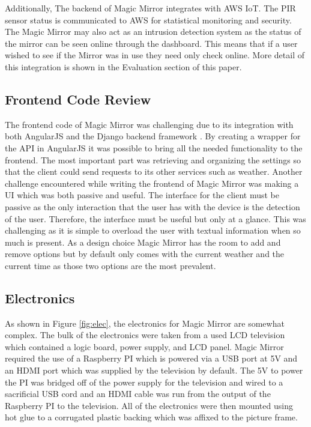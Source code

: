 \documentclass[conference]{IEEEtran}
\begin{document}
Additionally, The backend of Magic Mirror integrates with AWS IoT.
The PIR sensor status is communicated to AWS for statistical monitoring and security.
The Magic Mirror may also act as an intrusion detection system as the status of the mirror can be seen online through the dashboard.
This means that if a user wished to see if the Mirror was in use they need only check online.
More detail of this integration is shown in the Evaluation section of this paper.

\subsection{Frontend Code Review}
The frontend code of Magic Mirror was challenging due to its integration with both AngularJS and the Django backend framework \cite{angularjs}.
By creating a wrapper for the API in AngularJS it was possible to bring all the needed functionality to the frontend.
The most important part was retrieving and organizing the settings so that the client could send requests to its other services such as weather.
Another challenge encountered while writing the frontend of Magic Mirror was making a UI which was both passive and useful.
The interface for the client must be passive as the only interaction that the user has with the device is the detection of the user.
Therefore, the interface must be useful but only at a glance.
This was challenging as it is simple to overload the user with textual information when so much is present.
As a design choice Magic Mirror has the room to add and remove options but by default only comes with the current weather and the current time as those two options are the most prevalent.

\subsection{Electronics}
As shown in Figure \ref{fig:elec}, the electronics for Magic Mirror are somewhat complex.
The bulk of the electronics were taken from a used LCD television which contained a logic board, power supply, and LCD panel.
Magic Mirror required the use of a Raspberry PI which is powered via a USB port at 5V and an HDMI port which was supplied by the television by default.
The 5V to power the PI was bridged off of the power supply for the television and wired to a sacrificial USB cord and an HDMI cable was run from the output of the Raspberry PI to the television.
All of the electronics were then mounted using hot glue to a corrugated plastic backing which was affixed to the picture frame.
\end{document}
